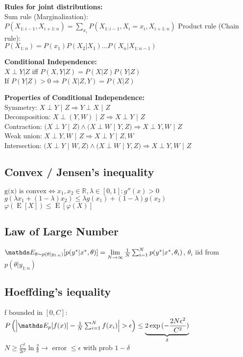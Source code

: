 
\textbf{Rules for joint distributions:}\\
Sum rule (Marginalization):\\
    $P(X_{1:i-1}, X_{i+1:n})=\sum_{x_i}P(X_{1:i-1}, X_i=x_i, X_{i+1:n})$
Product rule (Chain rule):\\
    $P(X_{1:n})=P(x_1)P(X_2|X_1)...P(X_n|X_{1:n-1})$

\textbf{Conditional Independence:}\\
$X\perp Y | Z $ iff $P(X,Y|Z)=P(X|Z)P(Y|Z)$\\
If $P(Y|Z)>0 \Rightarrow P(X|Z,Y)=P(X|Z)$

\textbf{Properties of Conditional Independence:}\\
Symmetry: $X \perp Y$ | $Z \Rightarrow Y \perp X$ | $Z$\\
Decomposition: $X \perp (Y,W)$ | $Z \Rightarrow X \perp Y$ | $Z$\\
Contraction: $(X \perp Y$ | $Z) \wedge (X \perp W$ | $Y, Z) \Rightarrow X \perp Y, W$ | $Z$\\
Weak union: $X \perp Y,W$ | $Z \Rightarrow X \perp Y$ | $Z, W$\\
Intersection: $(X \perp Y$ | $W, Z) \wedge (X \perp W$ | $Y, Z) \Rightarrow X \perp Y, W$ | $Z$


\subsection{Convex / Jensen's inequality}
$\text{g(x) is convex} \Leftrightarrow x_1,x_2 \in \mathbb{R}, \lambda \in [0,1]: g''(x) > 0$\\
$g(\lambda x_1 + (1-\lambda) x_2) \leq \lambda g(x_1) + (1-\lambda) g(x_2)$
$\varphi(\operatorname{E}[X]) \leq  \operatorname{E}[\varphi(X)]$


\subsection{Law of Large Number}
$\E[\theta \sim p(\theta|y_{1:n})]{p(y^{*}|x^{*}, \theta)} =
\lim\limits_{N \to \infty} \frac{1}{N} \sum_{i=1}^{N}p(y^{*}|x^{*}, \theta_{i})$, $\theta_{i}$ iid from $p(\theta|y_{1:n})$\\
\subsection{Hoeffding's iequality}
f bounded in $\left[0,C\right]$:
$P\bb{\abs{\E[p]{f(x)}-\frac{1}{N}\sum_{i=1}^{N}f(x_{i})} > \epsilon} \leq
\underbrace{2\exp{(-\frac{2N\epsilon^{2}}{C^2}})}_{\delta}$ \\
$N \geq \frac{C^2}{2\epsilon^2}\ln{\frac{2}{\delta}} \rightarrow$ error $\leq \epsilon$ with prob $1 - \delta$
